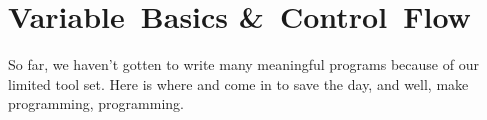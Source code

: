 %

\chapter{Variable~Basics \&~Control~Flow}

So far, we haven't gotten to write many meaningful programs because of
our limited tool set.  Here is where  and  come in to save the day, and well, make programming,
programming.
